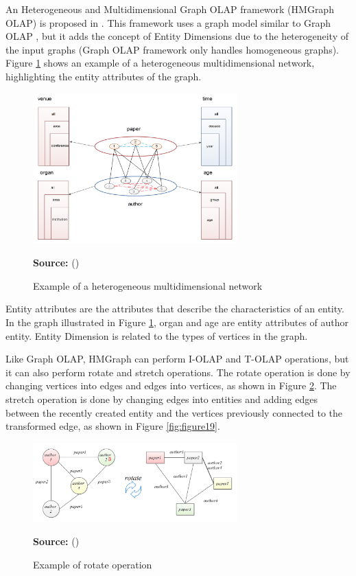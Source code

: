 An Heterogeneous and Multidimensional Graph OLAP framework (HMGraph OLAP) is proposed in \cite{Yin2012}. This framework uses a graph model similar to Graph OLAP \cite{Chen2008}, but it adds the concept of Entity Dimensions due to the heterogeneity of the input graphs (Graph OLAP framework only handles homogeneous graphs). Figure \ref{fig:figure17} shows an example of a heterogeneous multidimensional network, highlighting the entity attributes of the graph.

\begin{figure}[ht]
\centering
\caption{Example of a heterogeneous multidimensional network}
\label{fig:figure17}
\includegraphics[width=0.7\textwidth]{images/heterogeneous_graph_example.png}
\par\medskip\ABNTEXfontereduzida\selectfont\textbf{Source:} \citeauthor{Yin2012} (\citeyear{Yin2012}) \par\medskip
\end{figure}

Entity attributes are the attributes that describe the characteristics of an entity. In the graph illustrated in Figure \ref{fig:figure17}, organ and age are entity attributes of author entity. Entity Dimension is related to the types of vertices in the graph.

Like Graph OLAP, HMGraph can perform I-OLAP and T-OLAP operations, but it can also perform rotate and stretch operations. The rotate operation is done by changing vertices into edges and edges into vertices, as shown in Figure  \ref{fig:figure18}. The stretch operation is done by changing edges into entities and adding edges between the recently created entity and the vertices previously connected to the transformed edge, as shown in Figure \ref{fig:figure19}.

\begin{figure}[ht]
\centering
\caption{Example of rotate operation}
\label{fig:figure18}
\includegraphics[width=0.7\textwidth]{images/rotate_operation_example.png}
\par\medskip\ABNTEXfontereduzida\selectfont\textbf{Source:} \citeauthor{Yin2012} (\citeyear{Yin2012}) \par\medskip
\end{figure}

